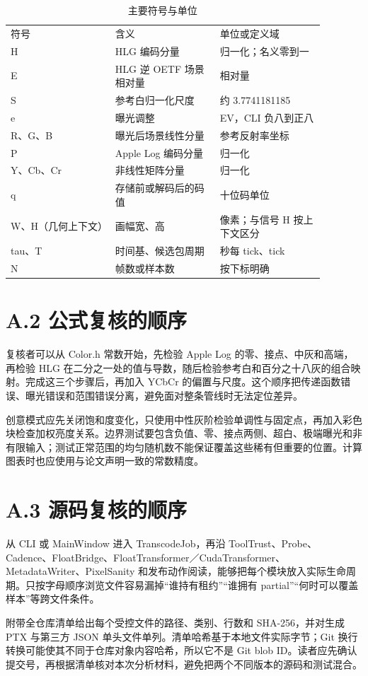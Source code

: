 \documentclass[UTF8,zihao=-4,openany]{ctexbook}
\begin{document}
\begin{longtable}{p{0.293\linewidth}p{0.293\linewidth}p{0.293\linewidth}}
\caption{主要符号与单位}\\
\toprule
符号 & 含义 & 单位或定义域\\
H & HLG 编码分量 & 归一化；名义零到一\\
E & HLG 逆 OETF 场景相对量 & 相对量\\
S & 参考白归一化尺度 & 约 3.7741181185\\
e & 曝光调整 & EV，CLI 负八到正八\\
R、G、B & 曝光后场景线性分量 & 参考反射率坐标\\
P & Apple Log 编码分量 & 归一化\\
Y、Cb、Cr & 非线性矩阵分量 & 归一化\\
q & 存储前或解码后的码值 & 十位码单位\\
W、H（几何上下文） & 画幅宽、高 & 像素；与信号 H 按上下文区分\\
tau、T & 时间基、候选包周期 & 秒每 tick、tick\\
N & 帧数或样本数 & 按下标明确\\
\bottomrule
\end{longtable}

\section*{A.2 公式复核的顺序}
复核者可以从 Color.h 常数开始，先检验 Apple Log 的零、接点、中灰和高端，再检验 HLG 在二分之一处的值与导数，随后检验参考白和百分之十八灰的组合映射。完成这三个步骤后，再加入 YCbCr 的偏置与尺度。这个顺序把传递函数错误、曝光错误和范围错误分离，避免面对整条管线时无法定位差异。

创意模式应先关闭饱和度变化，只使用中性灰阶检验单调性与固定点，再加入彩色块检查加权亮度关系。边界测试要包含负值、零、接点两侧、超白、极端曝光和非有限输入；测试正常范围的均匀随机数不能保证覆盖这些稀有但重要的位置。计算图表时也应使用与论文声明一致的常数精度。


\section*{A.3 源码复核的顺序}
从 CLI 或 MainWindow 进入 TranscodeJob，再沿 ToolTrust、Probe、Cadence、FloatBridge、FloatTransformer／CudaTransformer、MetadataWriter、PixelSanity 和发布动作阅读，能够把每个模块放入实际生命周期。只按字母顺序浏览文件容易漏掉“谁持有租约”“谁拥有 partial”“何时可以覆盖样本”等跨文件条件。

附带全仓库清单给出每个受控文件的路径、类别、行数和 SHA-256，并对生成 PTX 与第三方 JSON 单头文件单列。清单哈希基于本地文件实际字节；Git 换行转换可能使其不同于仓库对象内容哈希，所以它不是 Git blob ID。读者应先确认提交号，再根据清单核对本次分析材料，避免把两个不同版本的源码和测试混合。
\end{document}
